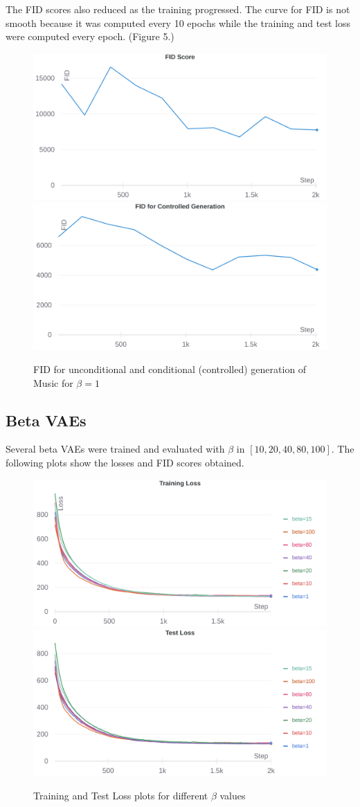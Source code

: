 \documentclass{article}
\begin{document}
The FID scores also reduced as the training progressed. The curve for FID is not smooth because it was computed every 10 epochs while the training and test loss were computed every epoch. (Figure 5.)

\begin{figure}
\begin{center}
\includegraphics[width=0.4\linewidth]{fid_beta_1.png}
\includegraphics[width=0.4\linewidth]{controlled_fid_beta_1.png}
\caption{FID for unconditional and conditional (controlled) generation of Music for $\beta = 1$}
\end{center}
\end{figure}

\subsection{Beta VAEs}

Several beta VAEs were trained and evaluated with $\beta$ in $[10, 20, 40, 80, 100]$. The following plots show the losses and FID scores obtained.

\begin{figure}[h]
\begin{center}
\includegraphics[width=0.4\linewidth]{combined_training_loss.png}
\includegraphics[width=0.4\linewidth]{combined_test_loss.png}
\caption{Training and Test Loss plots for different $\beta$ values}
\end{center}
\end{figure}
\end{document}
